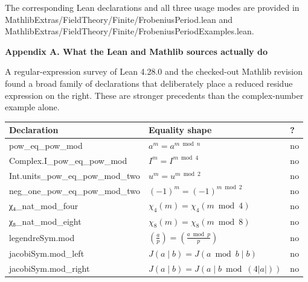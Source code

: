 \documentclass[10pt]{article}
\newcommand{\code}[1]{{\leanfont #1}}
\begin{document}
\vspace{5mm}

\vfill
\begin{center}\small\color{muted}
The corresponding Lean declarations and all three usage modes are provided in\\
\code{MathlibExtras/FieldTheory/Finite/FrobeniusPeriod.lean} and\\
\code{MathlibExtras/FieldTheory/Finite/FrobeniusPeriodExamples.lean}.
\end{center}


\newpage
\begin{center}
{\Large\bfseries\color{navy} Appendix A. What the Lean and Mathlib sources actually do}
\end{center}

A regular-expression survey of Lean 4.28.0 and the checked-out Mathlib revision found a broad family of declarations that deliberately place a reduced residue expression on the right.  These are stronger precedents than the complex-number example alone.

\begin{center}
\renewcommand{\arraystretch}{1.32}
\begin{tabular}{p{.36\linewidth}p{.43\linewidth}p{.10\linewidth}}
\toprule
Declaration & Equality shape & \code{[simp]}?\\ \midrule
\code{pow\_eq\_pow\_mod} & $a^m=a^{m\bmod n}$ & no\\
\code{Complex.I\_pow\_eq\_pow\_mod} & $I^m=I^{m\bmod4}$ & no\\
\code{Int.units\_pow\_eq\_pow\_mod\_two} & $u^m=u^{m\bmod2}$ & no\\
\code{neg\_one\_pow\_eq\_pow\_mod\_two} & $(-1)^m=(-1)^{m\bmod2}$ & no\\
\code{χ₄\_nat\_mod\_four} & $\chi_4(m)=\chi_4(m\bmod4)$ & no\\
\code{χ₈\_nat\_mod\_eight} & $\chi_8(m)=\chi_8(m\bmod8)$ & no\\
\code{legendreSym.mod} & $(\frac ap)=(\frac{a\bmod p}{p})$ & no\\
\code{jacobiSym.mod\_left} & $J(a\mid b)=J(a\bmod b\mid b)$ & no\\
\code{jacobiSym.mod\_right} & $J(a\mid b)=J(a\mid b\bmod(4|a|))$ & no\\
\bottomrule
\end{tabular}
\end{center}
\end{document}
